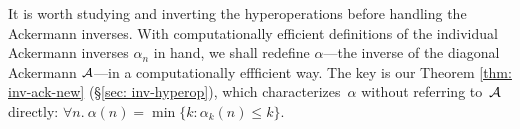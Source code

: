 It is worth studying and inverting the hyperoperations before handling the Ackermann inverses.
With computationally efficient definitions of the individual Ackermann inverses $\alpha_n$ in hand, we shall redefine $\alpha$---the inverse of the diagonal Ackermann $\mathcal{A}$---in a computationally effficient way.  The key is our 
Theorem \ref{thm: inv-ack-new} (\S\ref{sec: inv-hyperop}), which characterizes~$\alpha$ without referring to~$\mathcal{A}$ directly: $\forall n.~ \alpha(n) = \min\big\{k : \alpha_k(n)\le k \big\}$.





